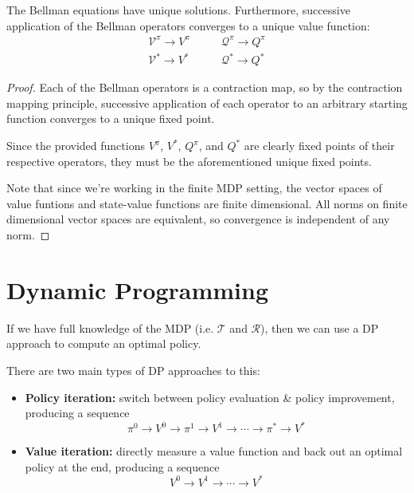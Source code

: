 \documentclass[twoside,10pt]{report}
\begin{document}
\begin{cor}
	\label{bellmanoperators}
	The Bellman equations have unique solutions. Furthermore, successive application of the Bellman operators converges to a unique value function:
\begin{align*}
	\mathcal{V}^{\pi} \to V^{\pi} &\qquad \mathcal{Q}^{\pi} \to Q^{\pi}\\
	\mathcal{V}^{*} \to V^{*} &\qquad \mathcal{Q}^{*} \to Q^{*}
\end{align*}
\end{cor}
\begin{proof}
	Each of the Bellman operators is a contraction map, so by the contraction mapping principle, successive application of each operator to an arbitrary starting function converges to a unique fixed point.

	Since the provided functions $V^{\pi}$, $V^{*}$, $Q^{\pi}$, and $Q^{*}$ are clearly fixed points of their respective operators, they must be the aforementioned unique fixed points.

	Note that since we're working in the finite MDP setting, the vector spaces of value funtions and state-value functions are finite dimensional. All norms on finite dimensional vector spaces are equivalent, so convergence is independent of any norm.
\end{proof}


\section{Dynamic Programming}

If we have full knowledge of the MDP (i.e. $\mathcal{T}$ and $\mathcal{R}$), then we can use a DP approach to compute an optimal policy.

There are two main types of DP approaches to this:
\begin{itemize}
	\item \textbf{Policy iteration:} switch between policy evaluation \& policy improvement, producing a sequence
		\[
		\pi^{0} \to V^{0} \to \pi^{1}\to V^1 \to \cdots \to \pi^{*} \to V^{*}
		\] 
	\item \textbf{Value iteration:} directly measure a value function and back out an optimal policy at the end, producing a sequence
		\[
		V^{0} \to V^1 \to \cdots \to V^{*}
		\] 
\end{itemize}
\end{document}
